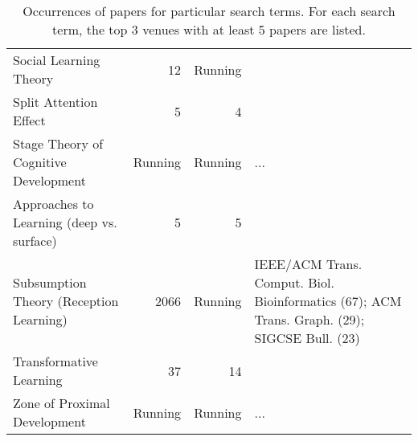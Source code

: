 \begin{table*}[t]
\begin{tabular}{lrrp{6cm}}
Social Learning Theory & 12 & Running &  \\
Split Attention Effect & 5 & 4 &  \\
Stage Theory of Cognitive Development & Running & Running & ... \\
Approaches to Learning (deep vs. surface) & 5 & 5 &  \\
Subsumption Theory (Reception Learning) & 2066 & Running & IEEE/ACM Trans. Comput. Biol. Bioinformatics (67); ACM Trans. Graph. (29); SIGCSE Bull. (23) \\
Transformative Learning & 37 & 14 &  \\
Zone of Proximal Development & Running & Running & ... \\
\end{tabular}
\caption{Occurrences of papers for particular search terms. For each search term, the top 3 venues with at least 5 papers are listed.}
\end{table*}